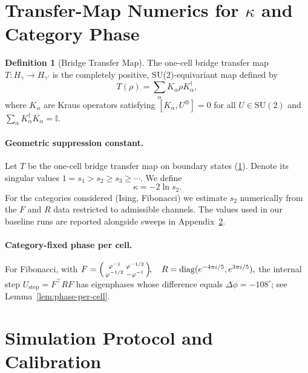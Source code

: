 \documentclass[11pt]{article}
\theoremstyle{plain}
\theoremstyle{definition}
\newtheorem{definition}[theorem]{Definition}
\begin{document}
\section{Transfer-Map Numerics for $\kappa$ and Category Phase}\label{app:transfer-numerics}

\begin{definition}[Bridge Transfer Map]\label{def:transfer-map}
  The one-cell bridge transfer map $T: H_\gamma \to H_{\gamma'}$ is the completely positive, SU(2)-equivariant map defined by
  \[
    T(\rho) = \sum_{\alpha} K_\alpha \rho K_\alpha^\dagger,
  \]
  where $K_\alpha$ are Kraus operators satisfying $[K_\alpha, U^{\otimes}] = 0$ for all $U \in \mathrm{SU}(2)$ and $\sum_\alpha K_\alpha^\dagger K_\alpha = \mathbb{I}$.
\end{definition}

\paragraph{Geometric suppression constant.}
Let $T$ be the one-cell bridge transfer map on boundary states (\ref{def:transfer-map}). Denote its singular values $1=s_1>s_2\ge s_3\ge\cdots$. We define
\begin{equation}
  \kappa = -2\ln s_2.
\end{equation}
For the categories considered (Ising, Fibonacci) we estimate $s_2$ numerically from the $F$ and $R$ data restricted to admissible channels. The values used in our baseline runs are reported alongside sweeps in Appendix~\ref{app:sim-protocol}.

\paragraph{Category-fixed phase per cell.}
For Fibonacci, with
\(
  F=
  \begin{psmallmatrix}
    \varphi^{-1} & \varphi^{-1/2}\\
    \varphi^{-1/2} & -\varphi^{-1}
  \end{psmallmatrix}\!,
  \quad
  R=\mathrm{diag}(e^{-4\pi i/5}, e^{3\pi i/5}),
\)
the internal step $U_{\mathrm{step}}=F^\top R F$ has eigenphases whose difference equals $\Delta\phi=-108^\circ$; see Lemma~\ref{lem:phase-per-cell}.

\section{Simulation Protocol and Calibration}\label{app:sim-protocol}
\end{document}
